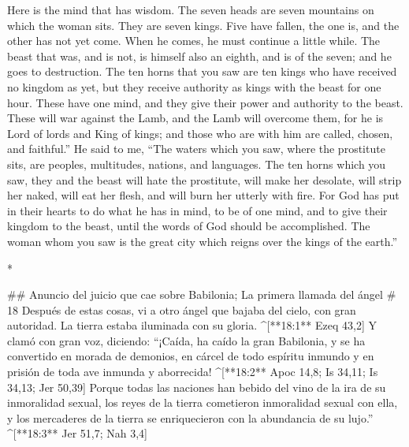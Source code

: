 \begin{paracols}{2}
\begin{english}
 Here is the mind that has wisdom. The seven heads are seven mountains on which the woman sits.  They are seven kings. Five have fallen, the one is, and the other has not yet come. When he comes, he must continue a little while.  The beast that was, and is not, is himself also an eighth, and is of the seven; and he goes to destruction.  The ten horns that you saw are ten kings who have received no kingdom as yet, but they receive authority as kings with the beast for one hour.  These have one mind, and they give their power and authority to the beast.  These will war against the Lamb, and the Lamb will overcome them, for he is Lord of lords and King of kings; and those who are with him are called, chosen, and faithful.”  He said to me, “The waters which you saw, where the prostitute sits, are peoples, multitudes, nations, and languages.  The ten horns which you saw, they and the beast will hate the prostitute, will make her desolate, will strip her naked, will eat her flesh, and will burn her utterly with fire.  For God has put in their hearts to do what he has in mind, to be of one mind, and to give their kingdom to the beast, until the words of God should be accomplished.  The woman whom you saw is the great city which reigns over the kings of the earth.” 

\end{english}
\switchcolumn[0]*

## Anuncio del juicio que cae sobre Babilonia; La primera llamada del ángel
# 18
 Después de estas cosas, vi a otro ángel que bajaba del cielo, con gran autoridad. La tierra estaba iluminada con su gloria. ^[**18:1** Ezeq 43,2]  Y clamó con gran voz, diciendo: “¡Caída, ha caído la gran Babilonia, y se ha convertido en morada de demonios, en cárcel de todo espíritu inmundo y en prisión de toda ave inmunda y aborrecida! ^[**18:2** Apoc 14,8; Is 34,11; Is 34,13; Jer 50,39]  Porque todas las naciones han bebido del vino de la ira de su inmoralidad sexual, los reyes de la tierra cometieron inmoralidad sexual con ella, y los mercaderes de la tierra se enriquecieron con la abundancia de su lujo.” ^[**18:3** Jer 51,7; Nah 3,4]


\end{paracols}
